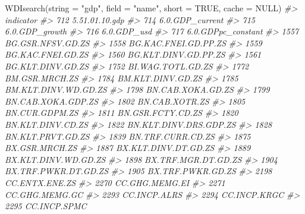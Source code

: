 \documentclass[
]{bxjsbook}
\newenvironment{Shaded}{\begin{snugshade}}{\end{snugshade}}
\newcommand{\AttributeTok}[1]{\textcolor[rgb]{0.77,0.63,0.00}{#1}}
\newcommand{\CommentTok}[1]{\textcolor[rgb]{0.56,0.35,0.01}{\textit{#1}}}
\newcommand{\ConstantTok}[1]{\textcolor[rgb]{0.00,0.00,0.00}{#1}}
\newcommand{\FunctionTok}[1]{\textcolor[rgb]{0.00,0.00,0.00}{#1}}
\newcommand{\NormalTok}[1]{#1}
\newcommand{\StringTok}[1]{\textcolor[rgb]{0.31,0.60,0.02}{#1}}
\theoremstyle{definition}
\theoremstyle{definition}
\theoremstyle{definition}
\theoremstyle{definition}
\theoremstyle{remark}
\begin{document}
\begin{Shaded}
\begin{Highlighting}[]
\FunctionTok{WDIsearch}\NormalTok{(}\AttributeTok{string =} \StringTok{"gdp"}\NormalTok{, }\AttributeTok{field =} \StringTok{"name"}\NormalTok{, }\AttributeTok{short =} \ConstantTok{TRUE}\NormalTok{, }\AttributeTok{cache =} \ConstantTok{NULL}\NormalTok{)}
\CommentTok{\#\textgreater{}                        indicator}
\CommentTok{\#\textgreater{} 712               5.51.01.10.gdp}
\CommentTok{\#\textgreater{} 714              6.0.GDP\_current}
\CommentTok{\#\textgreater{} 715               6.0.GDP\_growth}
\CommentTok{\#\textgreater{} 716                  6.0.GDP\_usd}
\CommentTok{\#\textgreater{} 717           6.0.GDPpc\_constant}
\CommentTok{\#\textgreater{} 1557           BG.GSR.NFSV.GD.ZS}
\CommentTok{\#\textgreater{} 1558        BG.KAC.FNEI.GD.PP.ZS}
\CommentTok{\#\textgreater{} 1559           BG.KAC.FNEI.GD.ZS}
\CommentTok{\#\textgreater{} 1560        BG.KLT.DINV.GD.PP.ZS}
\CommentTok{\#\textgreater{} 1561           BG.KLT.DINV.GD.ZS}
\CommentTok{\#\textgreater{} 1752           BI.WAG.TOTL.GD.ZS}
\CommentTok{\#\textgreater{} 1772              BM.GSR.MRCH.ZS}
\CommentTok{\#\textgreater{} 1784           BM.KLT.DINV.GD.ZS}
\CommentTok{\#\textgreater{} 1785        BM.KLT.DINV.WD.GD.ZS}
\CommentTok{\#\textgreater{} 1798           BN.CAB.XOKA.GD.ZS}
\CommentTok{\#\textgreater{} 1799          BN.CAB.XOKA.GDP.ZS}
\CommentTok{\#\textgreater{} 1802              BN.CAB.XOTR.ZS}
\CommentTok{\#\textgreater{} 1805              BN.CUR.GDPM.ZS}
\CommentTok{\#\textgreater{} 1811           BN.GSR.FCTY.CD.ZS}
\CommentTok{\#\textgreater{} 1820           BN.KLT.DINV.CD.ZS}
\CommentTok{\#\textgreater{} 1822      BN.KLT.DINV.DRS.GDP.ZS}
\CommentTok{\#\textgreater{} 1828           BN.KLT.PRVT.GD.ZS}
\CommentTok{\#\textgreater{} 1839           BN.TRF.CURR.CD.ZS}
\CommentTok{\#\textgreater{} 1875              BX.GSR.MRCH.ZS}
\CommentTok{\#\textgreater{} 1887        BX.KLT.DINV.DT.GD.ZS}
\CommentTok{\#\textgreater{} 1889        BX.KLT.DINV.WD.GD.ZS}
\CommentTok{\#\textgreater{} 1898         BX.TRF.MGR.DT.GD.ZS}
\CommentTok{\#\textgreater{} 1904        BX.TRF.PWKR.DT.GD.ZS}
\CommentTok{\#\textgreater{} 1905           BX.TRF.PWKR.GD.ZS}
\CommentTok{\#\textgreater{} 2198              CC.ENTX.ENE.ZS}
\CommentTok{\#\textgreater{} 2270              CC.GHG.MEMG.EI}
\CommentTok{\#\textgreater{} 2271              CC.GHG.MEMG.GC}
\CommentTok{\#\textgreater{} 2293                CC.INCP.ALRS}
\CommentTok{\#\textgreater{} 2294                CC.INCP.KRGC}
\CommentTok{\#\textgreater{} 2295                CC.INCP.SPMC}

\end{Highlighting}
\end{Shaded}
\end{document}
